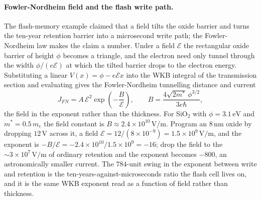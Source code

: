 \paragraph{Fowler-Nordheim field and the flash write path.}
The flash-memory example claimed that a field tilts the oxide barrier and
turns the ten-year retention barrier into a microsecond write path; the
Fowler-Nordheim law makes the claim a number. Under a field $\mathcal{E}$
the rectangular oxide barrier of height $\phi$ becomes a triangle, and the
electron need only tunnel through the width $\phi/(e\mathcal{E})$ at which the
tilted barrier drops to the electron energy. Substituting a linear $V(x) =
\phi - e\mathcal{E}x$ into the WKB integral of the transmission section and
evaluating gives the Fowler-Nordheim tunnelling distance and current
\[
J_{FN} = A\,\mathcal{E}^{2}\exp\!\left(-\frac{B}{\mathcal{E}}\right),
\qquad
B = \frac{4\sqrt{2m^{*}}\,\phi^{3/2}}{3e\hbar},
\]
the field in the exponent rather than the thickness. For SiO$_2$ with
$\phi = 3.1\,\si{\electronvolt}$ and $m^{*} = 0.5\,m_e$ the field constant
is $B \approx 2.4\times 10^{10}\,\si{\volt\per\meter}$. Program an $8\,\si{
\nano\meter}$ oxide by dropping $12\,\si{\volt}$ across it, a field
$\mathcal{E} = 12/(8\times 10^{-9}) = 1.5\times 10^{9}\,\si{\volt\per
\meter}$, and the exponent is $-B/\mathcal{E} = -2.4\times 10^{10}/1.5\times
10^{9} = -16$; drop the field to the $\sim 3\times 10^{7}\,\si{\volt\per
\meter}$ of ordinary retention and the exponent becomes $-800$, an
astronomically smaller current. The $784$-unit swing in the exponent between
write and retention is the ten-years-against-microseconds ratio the flash
cell lives on, and it is the same WKB exponent read as a function of field
rather than thickness.

